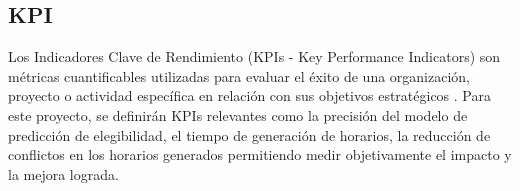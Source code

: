 \subsection{KPI}
Los Indicadores Clave de Rendimiento (KPIs - Key Performance Indicators) son métricas cuantificables utilizadas para evaluar el éxito de una organización, proyecto o actividad específica en relación con sus objetivos estratégicos \parencite{Parmenter2015}.
Para este proyecto, se definirán KPIs relevantes como la precisión del modelo de predicción de elegibilidad, el tiempo de generación de horarios, la reducción de conflictos en los horarios generados permitiendo medir objetivamente el impacto y la mejora lograda.
